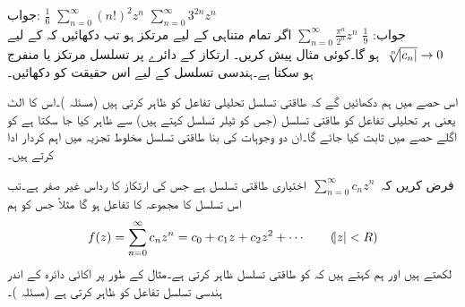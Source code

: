 جواب:\quad
$\tfrac{1}{6}$
\quad
$\sum\limits_{n=0}^{\infty} (n!)^2 z^n$
\quad
$\sum\limits_{n=0}^{\infty} 3^{2n}z^n$\\
جواب:\quad
$\tfrac{1}{9}$
\quad
$\sum\limits_{n=0}^{\infty} \tfrac{\pi^n}{2^n}z^n$
\quad
اگر  تمام متناہی  کے لیے مرتکز ہو تب دکھائیں کہ  کے لیے 
$\,\sqrt[\leftroot{-2}n]{\abs{c_n}}\to 0\,$
ہو گا۔کوئی مثال پیش کریں۔
\quad
ارتکاز کے دائرے پر تسلسل مرتکز یا منفرج ہو سکتا ہے۔ہندسی تسلسل کے لیے اس حقیقت کو دکھائیں۔

اس حصے میں ہم دکھائیں گے کہ طاقتی تسلسل تحلیلی تفاعل کو ظاہر کرتی ہیں (مسئلہ )۔اس کا الٹ یعنی ہر تحلیلی تفاعل کو طاقتی تسلسل (جس کو ٹیلر تسلسل کہتے ہیں) سے ظاہر کیا جا سکتا ہے کو اگلے حصے میں ثابت کیا جائے گا۔ان دو وجوہات کی بنا طاقتی تسلسل مخلوط تجزیہ میں اہم کردار ادا کرتے ہیں۔

فرض کریں کہ 
$\,\sum_{n=0}^{\infty}c_nz^n\,$
اختیاری طاقتی تسلسل ہے جس کی ارتکاز کا رداس  غیر صفر ہے۔تب اس تسلسل کا مجموعہ  کا تفاعل ہو گا مثلاً  جس کو ہم
\begin{align}\label{مساوات_ٹیلر_طاقتی_تسلسل_اور_تحلیلی_تفاعل_الف}
f(z)=\sum\limits_{n=0}^{\infty} c_nz^n =c_0+c_1z+c_2z^2+\cdots\quad\quad (\abs{z}<R)
\end{align}
لکھتے ہیں اور ہم کہتے ہیں کہ  کو طاقتی تسلسل ظاہر کرتی ہے۔مثال کے طور پر اکائی دائرہ  کے اندر  ہندسی تسلسل  تفاعل  کو ظاہر کرتی ہے (مسئلہ )۔

